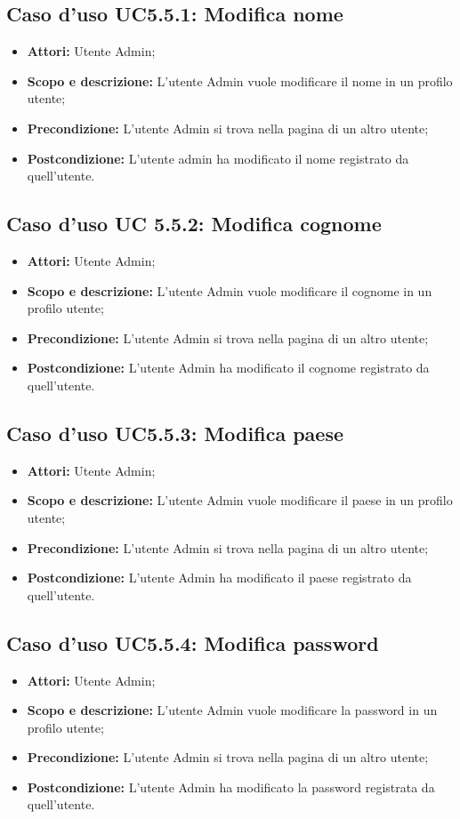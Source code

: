 \documentclass[12pt,a4paper,titlepage]{article}
\begin{document}
\subsection{Caso d'uso UC5.5.1: Modifica nome}
\begin{itemize}
	\item \textbf{Attori: }Utente Admin;
	\item \textbf{Scopo e descrizione: }L'utente Admin vuole modificare il nome in un profilo utente;
	\item \textbf{Precondizione: }L'utente Admin si trova nella pagina di un altro utente;
	\item \textbf{Postcondizione: }L'utente admin ha modificato il nome registrato da quell'utente.
\end{itemize}
\subsection{Caso d'uso UC 5.5.2: Modifica cognome}
\begin{itemize}
	\item \textbf{Attori: }Utente Admin;
	\item \textbf{Scopo e descrizione: }L'utente Admin vuole modificare il cognome in un profilo utente;
	\item \textbf{Precondizione: }L'utente Admin si trova nella pagina di un altro utente;
	\item \textbf{Postcondizione: }L'utente Admin ha modificato il cognome registrato da quell'utente.
\end{itemize}
\subsection{Caso d'uso UC5.5.3: Modifica paese}
\begin{itemize}
	\item \textbf{Attori: }Utente Admin;
	\item \textbf{Scopo e descrizione: }L'utente Admin vuole modificare il paese in un profilo utente;
	\item \textbf{Precondizione: }L'utente Admin si trova nella pagina di un altro utente;
	\item \textbf{Postcondizione: }L'utente Admin ha modificato il paese registrato da quell'utente.
\end{itemize}
\subsection{Caso d'uso UC5.5.4: Modifica password}
\begin{itemize}
	\item \textbf{Attori: }Utente Admin;
	\item \textbf{Scopo e descrizione: }L'utente Admin vuole modificare la password in un profilo utente;
	\item \textbf{Precondizione: }L'utente Admin si trova nella pagina di un altro utente;
	\item \textbf{Postcondizione: }L'utente Admin ha modificato la password registrata da quell'utente.
\end{itemize}
\end{document}
